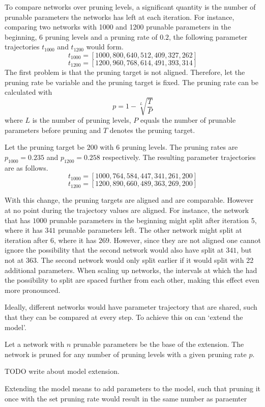 To compare networks over pruning levels, a significant quantity is the number of prunable parameters the networks has left at each iteration.
For instance, comparing two networks with 1000 and 1200 prunable parameters in the beginning, 6 pruning levels and a pruning rate of $0.2$, the following parameter trajectories $t_{1000}$ and $t_{1200}$ would form.
$$
t_{1000} = [1000, 800, 640, 512, 409, 327, 262]
$$
$$
t_{1200} = [1200, 960, 768, 614, 491, 393, 314]
$$
The first problem is that the pruning target is not aligned.
Therefore, let the pruning rate be variable and the pruning target is fixed.
The pruning rate can be calculated with 
$$
p = 1 - \sqrt[L]{\frac{T}{P}}
$$
where $L$ is the number of pruning levels, $P$ equals the number of prunable parameters before pruning and $T$ denotes the pruning target.

Let the pruning target be $200$ with 6 pruning levels.
The pruning rates are $p_{1000} = 0.235$ and $p_{1200} = 0.258$ respectively.
The resulting parameter trajectories are as follows.
$$
t_{1000} = [1000, 764, 584, 447, 341, 261, 200]
$$
$$
t_{1200} = [1200, 890, 660, 489, 363, 269, 200]
$$

With this change, the pruning targets are aligned and are comparable.
However at no point during the trajectory values are aligned.
For instance, the network that has $1000$ prunable parameters in the beginning might split after iteration 5, where it has $341$ prunable parameters left. 
The other network might split at iteration after 6, where it has $269$.
However, since they are not aligned one cannot ignore the possibility that the second network would also have split at $341$, but not at $363$. 
The second network would only split earlier if it would split with 22 additional parameters.
When scaling up networks, the intervals at which the had the possibility to split are spaced further from each other, making this effect even more pronounced.

Ideally, different networks would have parameter trajectory that are shared, such that they can be compared at every step.
To achieve this on can `extend the model'.

Let a network with $n$ prunable parameters be the base of the extension.
The network is pruned for any number of pruning levels with a given pruning rate $p$.

TODO write about model extension.

Extending the model means to add parameters to the model, such that pruning it once with the set pruning rate would result in the same number as paraemter

